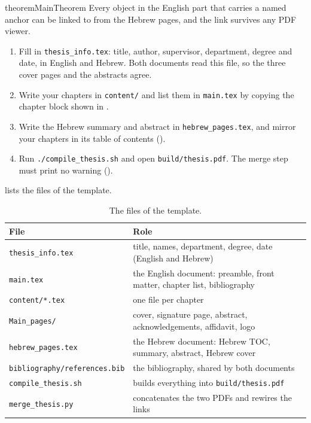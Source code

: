 \begin{restatable}{theorem}{MainTheorem}
\label{thm:main}\hypertarget{target:thm:main}{}%
Every object in the English part that carries a named anchor can be linked to from the Hebrew pages, and the link survives any PDF viewer.
\end{restatable}


\begin{enumerate}
    \item Fill in \texttt{thesis\_info.tex}: title, author, supervisor, department, degree and date, in English and Hebrew. Both documents read this file, so the three cover pages and the abstracts agree.
    \item Write your chapters in \texttt{content/} and list them in \texttt{main.tex} by copying the chapter block shown in .
    \item Write the Hebrew summary and abstract in \texttt{hebrew\_pages.tex}, and mirror your chapters in its table of contents ().
    \item Run \texttt{./compile\_thesis.sh} and open \texttt{build/thesis.pdf}. The merge step must print no warning ().
\end{enumerate}

 lists the files of the template.

\begin{table}[htb]
    \centering
    \caption{The files of the template.}
    \label{tab:files}
    \begin{tabular}{@{}l>{\raggedright\arraybackslash}p{}@{}}
        \toprule
        File & Role \\
        \midrule
        \texttt{thesis\_info.tex} & title, names, department, degree, date (English and Hebrew) \\
        \texttt{main.tex} & the English document: preamble, front matter, chapter list, bibliography \\
        \texttt{content/*.tex} & one file per chapter \\
        \texttt{Main\_pages/} & cover, signature page, abstract, acknowledgements, affidavit, logo \\
        \texttt{hebrew\_pages.tex} & the Hebrew document: Hebrew TOC, summary, abstract, Hebrew cover \\
        \texttt{bibliography/references.bib} & the bibliography, shared by both documents \\
        \texttt{compile\_thesis.sh} & builds everything into \texttt{build/thesis.pdf} \\
        \texttt{merge\_thesis.py} & concatenates the two PDFs and rewires the links \\
        \bottomrule
    \end{tabular}
\end{table}
